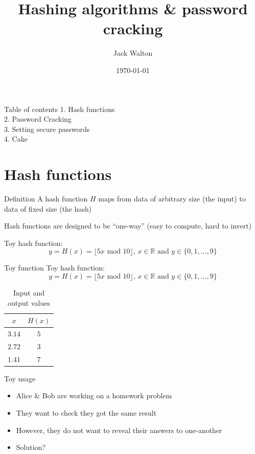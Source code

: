 \documentclass[12pt,aspectratio=169]{beamer}
\title{Hashing algorithms \& password cracking}
\author{Jack Walton}
\date{\today}
\institute{Newcastle University}
\renewcommand{\emph}[1]{{\color{mLightBrown}#1}}
\begin{document}
\maketitle

\begin{frame}{Table of contents}
  \vspace*{\fill}
  1. Hash functions\\[4mm]
  2. Password Cracking\\[4mm]
  3. Setting secure passwords\\[4mm]
  4. Cake
  \vfill
\end{frame}

\section{Hash functions}

\begin{frame}{Definition}
  A hash function $H$ maps from data of \emph{arbitrary size} (the input) to data of \emph{fixed size} (the hash)

  Hash functions are designed to be \emph{``one-way''} (easy to compute, hard to invert)

  Toy hash function:
  \begin{equation*}
    y = H(x) = \lfloor 5x \text{ mod } 10 \rfloor,\, x\in\mathbb{R} \text{ and } y\in\{0,1,\ldots,9\}
  \end{equation*}
\end{frame}

\begin{frame}{Toy function}
  Toy hash function:
  \begin{equation*}
    y = H(x) = \lfloor 5x \text{ mod } 10 \rfloor,\, x\in\mathbb{R} \text{ and } y\in\{0,1,\ldots,9\}
  \end{equation*}
  \begin{table}[h]
    \begin{tabular}{@{}cc@{}}
      \toprule
      $x$    & $H(x)$ \\\midrule
      $3.14$ & $5$    \\
      $2.72$ & $3$    \\
      $1.41$ & $7$    \\\bottomrule
    \end{tabular}
    \caption{Input and output values}
  \end{table}
\end{frame}

\begin{frame}{Toy usage}
  \begin{itemize}
    \item Alice \& Bob are working on a homework problem
    \item They want to check they got the same result
    \item However, they do not want to reveal their answers to one-another
    \item Solution? \onslide<2->{\emph{Hash and compare}}
  \end{itemize}
\end{frame}
\end{document}
